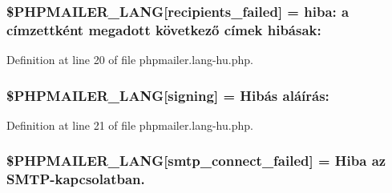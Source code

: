 \subsubsection[{\texorpdfstring{\$\+P\+H\+P\+M\+A\+I\+L\+E\+R\+\_\+\+L\+A\+NG}{$PHPMAILER_LANG}}]{\setlength{\rightskip}{0pt plus 5cm}\$P\+H\+P\+M\+A\+I\+L\+E\+R\+\_\+\+L\+A\+NG\mbox{[}\textquotesingle{}recipients\+\_\+failed\textquotesingle{}\mbox{]} =  hiba\+: {\bf a} címzettként megadott következő címek hibásak\+: \textquotesingle{}}\hypertarget{phpmailer_8lang-hu_8php_a7589d30bb9b368327c2df015f3e6bcba}{}\label{phpmailer_8lang-hu_8php_a7589d30bb9b368327c2df015f3e6bcba}


Definition at line 20 of file phpmailer.\+lang-\/hu.\+php.

\subsubsection[{\texorpdfstring{\$\+P\+H\+P\+M\+A\+I\+L\+E\+R\+\_\+\+L\+A\+NG}{$PHPMAILER_LANG}}]{\setlength{\rightskip}{0pt plus 5cm}\$P\+H\+P\+M\+A\+I\+L\+E\+R\+\_\+\+L\+A\+NG\mbox{[}\textquotesingle{}signing\textquotesingle{}\mbox{]} = \textquotesingle{}Hibás aláírás\+: \textquotesingle{}}\hypertarget{phpmailer_8lang-hu_8php_a68e437bdb9b968a5a67320f03d231565}{}\label{phpmailer_8lang-hu_8php_a68e437bdb9b968a5a67320f03d231565}


Definition at line 21 of file phpmailer.\+lang-\/hu.\+php.

\subsubsection[{\texorpdfstring{\$\+P\+H\+P\+M\+A\+I\+L\+E\+R\+\_\+\+L\+A\+NG}{$PHPMAILER_LANG}}]{\setlength{\rightskip}{0pt plus 5cm}\$P\+H\+P\+M\+A\+I\+L\+E\+R\+\_\+\+L\+A\+NG\mbox{[}\textquotesingle{}smtp\+\_\+connect\+\_\+failed\textquotesingle{}\mbox{]} = \textquotesingle{}Hiba az {\bf S\+M\+TP}-\/kapcsolatban.\textquotesingle{}}\hypertarget{phpmailer_8lang-hu_8php_a7b321d4ca1e9df702403ed4c61aa0980}{}\label{phpmailer_8lang-hu_8php_a7b321d4ca1e9df702403ed4c61aa0980}


